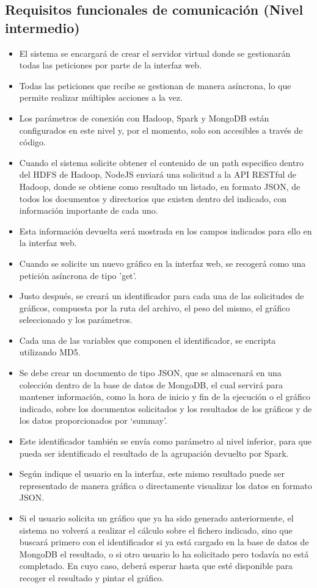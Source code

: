 \subsection{Requisitos funcionales de comunicación (Nivel intermedio)}
\begin{itemize}
	\item El sistema se encargará de crear el servidor virtual donde se gestionarán todas las peticiones por parte de la interfaz web.
	\item Todas las peticiones que recibe se gestionan de manera asíncrona, lo que permite realizar múltiples acciones a la vez.
	\item Los parámetros de conexión con Hadoop, Spark y MongoDB están configurados en este nivel y, por el momento, solo son accesibles a través de código.
	\item Cuando el sistema solicite obtener el contenido de un path especifico dentro del HDFS de Hadoop, NodeJS enviará una solicitud a la API RESTful de Hadoop, donde se obtiene como resultado un listado, en formato JSON, de todos los documentos y directorios que existen dentro del indicado, con información importante de cada uno.
	\item Esta información devuelta será mostrada en los campos indicados para ello en la interfaz web.
	\item Cuando se solicite un nuevo gráfico en la interfaz web, se recogerá como una petición asíncrona de tipo 'get'.
	\item Justo después, se creará un identificador para cada una de las solicitudes de gráficos, compuesta por la ruta del archivo, el peso del mismo, el gráfico seleccionado y los parámetros.
	\item Cada una de las variables que componen el identificador, se encripta utilizando MD5. 
	\item Se debe crear un documento de tipo JSON, que se almacenará en una colección dentro de la base de datos de MongoDB, el cual servirá para mantener información, como la hora de inicio y fin de la ejecución o el gráfico indicado, sobre los documentos solicitados y los resultados de los gráficos y de los datos proporcionados por ‘summay’. 
	\item Este identificador también se envía como parámetro al nivel inferior, para que pueda ser identificado el resultado de la agrupación devuelto por Spark.
	\item Según indique el usuario en la interfaz, este mismo resultado puede ser representado de manera gráfica o directamente visualizar los datos en formato JSON. 
	\item Si el usuario solicita un gráfico que ya ha sido generado anteriormente, el sistema no volverá a realizar el cálculo sobre el fichero indicado, sino que buscará primero con el identificador si ya está cargado en la base de datos de MongoDB el resultado, o si otro usuario lo ha solicitado pero todavía no está completado. En cuyo caso, deberá esperar hasta que esté disponible para recoger el resultado y pintar el gráfico.
\end{itemize}

